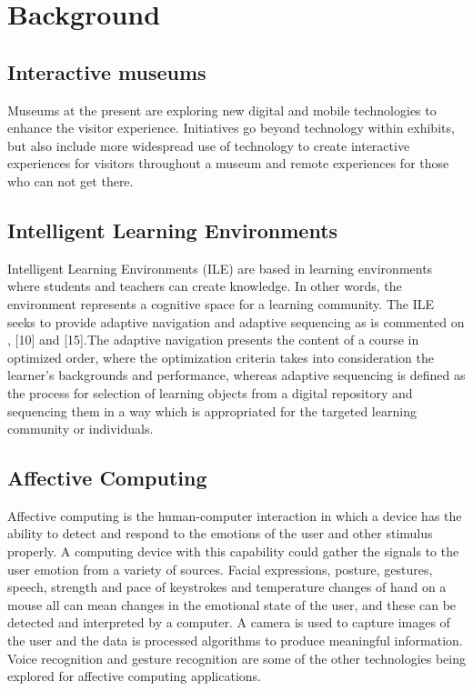 \documentclass[journal]{IEEEtran}
\begin{document}
\section {Background}

\subsection {Interactive museums}
Museums at the present are exploring new digital and mobile technologies to enhance the visitor experience. Initiatives go beyond technology within exhibits, but also include more widespread use of technology to create interactive experiences for visitors throughout a museum and remote experiences for those who can not get there.
\subsection {Intelligent Learning Environments}
Intelligent Learning Environments (ILE) are based in learning environments where students and teachers can create knowledge. In other words, the environment represents a cognitive space for a learning community. The ILE seeks to provide adaptive navigation and adaptive sequencing as is commented on  \cite{rondon89}, [10] and [15].The adaptive navigation presents the content of a course in optimized order, where the optimization criteria takes into consideration the learner's backgrounds and performance, whereas adaptive sequencing is defined as the process for selection of learning objects from a digital repository and sequencing them in a way which is appropriated for the targeted learning community or individuals. 
\subsection {Affective Computing}
Affective computing is the human-computer interaction in which a device has the ability to detect and respond to the emotions of the user and other stimulus properly. A computing device with this capability could gather the signals to the user emotion from a variety of sources. Facial expressions, posture, gestures, speech, strength and pace of keystrokes and temperature changes of hand on a mouse all can mean changes in the emotional state of the user, and these can be detected and interpreted by a computer. A camera is used to capture images of the user and the data is processed algorithms to produce meaningful information. Voice recognition and gesture recognition are some of the other technologies being explored for affective computing applications.
\end{document}
